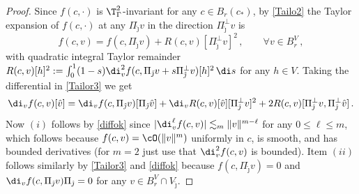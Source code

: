 \documentclass[11pt,a4paper,reqno]{article}
\numberwithin{equation}{section}
\theoremstyle{definition}
\begin{document}
\begin{appendix}
        \begin{proof}        
 Since  $ f (c, \cdot) $  is $ \T^2_\Gamma $-invariant for any $ c \in B_r (c_*) $, by     \eqref{Tailo2} 
           the Taylor expansion of $ f(c, \cdot) $
          at any $ \Pi_{\hat \jmath} v $ in the direction
            $ \Pi_{\hat \jmath}^\bot v $ is  
          \begin{equation}\label{Tailor3}
                f(c,v)=f(c,\Pi_{\hat \jmath} v)+R(c,v)[\Pi_{\hat \jmath}^\bot v]^2\, , 
                \qquad \forall v \in B_r^V \, ,  
            \end{equation}
           with 
           quadratic integral Taylor remainder 
            $  R(c,v)[h ]^2:=\int_0^1(1-s)\di_v^2 f(c,\Pi_{\hat \jmath} v+s\Pi_{\hat \jmath}^\bot v)[h ]^2\,\di s $ for any  $ h \in V $.
        Taking the differential in \eqref{Tailor3} we get 
            \begin{equation}\label{diffok}
            \di_v f(c,v)[\hat v]=\di_v f(c,\Pi_{\hat \jmath} v)[\Pi_{\hat \jmath} \hat v]+\di_v R (c,v)[\hat v] [\Pi_{\hat \jmath}^\bot v]^2+
               2 R (c,v)[\Pi_{\hat \jmath}^\bot v,\Pi_{\hat \jmath}^\bot \hat v]\, .
            \end{equation}         
            Now $(i)$ follows by \eqref{diffok}
            since $|\di_v^{\ell} f(c,v)|\lesssim_m \|v\|^{m-\ell} $ for any $  0\leq \ell \leq m$, 
        which follows because $ f (c, v) = \cO (\|v\|^m)$ uniformly in $ c $,  is smooth, and has bounded derivatives
        (for $ m =2 $ just use that $ \di_v^2 f(c,v) $ is bounded). 
Item  $(ii)$ follows similarly by \eqref{Tailor3} and \eqref{diffok}  because 
$ f(c,\Pi_{\hat \jmath} v) = 0 $  and  
    $ \di_v f(c,\Pi_{\hat \jmath} v) \Pi_{\hat \jmath} = 0 $ 
    for any $ v\in B_r^V\cap V_{\hat \jmath} $. 
        \end{proof}


\end{appendix}
\end{document}
